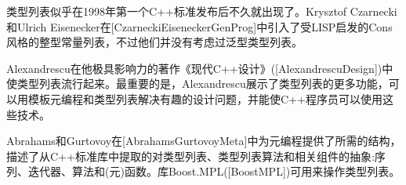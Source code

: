 类型列表似乎在1998年第一个C++标准发布后不久就出现了。Krysztof Czarnecki和Ulrich Eisenecker在[CzarneckiEiseneckerGenProg]中引入了受LISP启发的Cons风格的整型常量列表，不过他们并没有考虑过泛型类型列表。

Alexandrescu在他极具影响力的著作《现代C++设计》([AlexandrescuDesign])中使类型列表流行起来。最重要的是，Alexandrescu展示了类型列表的更多功能，可以用模板元编程和类型列表解决有趣的设计问题，并能使C++程序员可以使用这些技术。

Abrahams和Gurtovoy在[AbrahamsGurtovoyMeta]中为元编程提供了所需的结构，描述了从C++标准库中提取的对类型列表、类型列表算法和相关组件的抽象:序列、迭代器、算法和(元)函数。库Boost.MPL([BoostMPL])可用来操作类型列表。